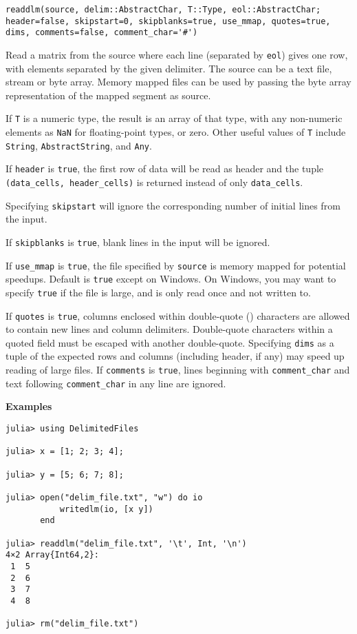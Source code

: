 \begin{adjustwidth}{2em}{0pt}


\begin{verbatim}
readdlm(source, delim::AbstractChar, T::Type, eol::AbstractChar; header=false, skipstart=0, skipblanks=true, use_mmap, quotes=true, dims, comments=false, comment_char='#')
\end{verbatim}

Read a matrix from the source where each line (separated by \texttt{eol}) gives one row, with elements separated by the given delimiter. The source can be a text file, stream or byte array. Memory mapped files can be used by passing the byte array representation of the mapped segment as source.

If \texttt{T} is a numeric type, the result is an array of that type, with any non-numeric elements as \texttt{NaN} for floating-point types, or zero. Other useful values of \texttt{T} include \texttt{String}, \texttt{AbstractString}, and \texttt{Any}.

If \texttt{header} is \texttt{true}, the first row of data will be read as header and the tuple \texttt{(data\_cells, header\_cells)} is returned instead of only \texttt{data\_cells}.

Specifying \texttt{skipstart} will ignore the corresponding number of initial lines from the input.

If \texttt{skipblanks} is \texttt{true}, blank lines in the input will be ignored.

If \texttt{use\_mmap} is \texttt{true}, the file specified by \texttt{source} is memory mapped for potential speedups. Default is \texttt{true} except on Windows. On Windows, you may want to specify \texttt{true} if the file is large, and is only read once and not written to.

If \texttt{quotes} is \texttt{true}, columns enclosed within double-quote ({\textquotedbl}) characters are allowed to contain new lines and column delimiters. Double-quote characters within a quoted field must be escaped with another double-quote.  Specifying \texttt{dims} as a tuple of the expected rows and columns (including header, if any) may speed up reading of large files.  If \texttt{comments} is \texttt{true}, lines beginning with \texttt{comment\_char} and text following \texttt{comment\_char} in any line are ignored.

\textbf{Examples}


\begin{verbatim}
julia> using DelimitedFiles

julia> x = [1; 2; 3; 4];

julia> y = [5; 6; 7; 8];

julia> open("delim_file.txt", "w") do io
           writedlm(io, [x y])
       end

julia> readdlm("delim_file.txt", '\t', Int, '\n')
4×2 Array{Int64,2}:
 1  5
 2  6
 3  7
 4  8

julia> rm("delim_file.txt")
\end{verbatim}



\end{adjustwidth}
